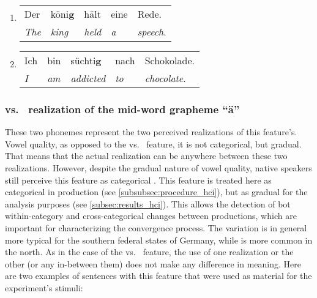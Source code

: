 \begin{enumerate}[label=\arabic{enumi}\alph*), ref=\arabic{enumi}\alph*.)]
	\item 
	\begin{tabulary}{\linewidth}{LLLLL}
		Der				& köni\textbf{\underline{g}} & hält				& 	eine	& Rede.\\
		\textit{The}	& \textit{king} 			 & \textit{held}	& \emph{a}  & \emph{speech}.\\
	\end{tabulary}
	\item
	\begin{tabulary}{\linewidth}{LLLLL}
		Ich 		& bin		  & süchti\textbf{\underline{g}} & nach 		& Schokolade.\\
		\textit{I}  & \textit{am} & \textit{addicted} 			 & \textit{to}  & \textit{chocolate}.\\
	\end{tabulary}
\end{enumerate}
	
\subsubsection*{\textipa{[e:]} vs.\ \textipa{[E:]} realization of the mid-word grapheme \enquote{ä}}
	
These two phonemes represent the two perceived realizations of this feature's.
Vowel quality, as opposed to the \textipa{[\c{c}]} vs.\ \textipa{[k]} feature, it is not categorical, but gradual.
That means that the actual realization can be anywhere between these two realizations.
However, despite the gradual nature of vowel quality, native speakers still perceive this feature as categorical \citep[either \textipa{[e]} or \textipa{[E]}, cf.][]{Kuhl2004early, Kuhl1991human}.
This feature is treated here as categorical in production (see \cref{subsubsec:procedure_hci}), but as gradual for the analysis purposes (see \cref{subsec:results_hci}).
This allows the detection of bot within-category and cross-categorical changes between productions, which are important for characterizing the convergence process.
The \textipa{[E]} variation is in general more typical for the southern federal states of Germany, while \textipa{[e]} is more common in the north.
As in the case of the \textipa{[\c{c}]} vs.\ \textipa{[k]} feature, the use of one realization or the other (or any in-between them) does not make any difference in meaning.
Here are two examples of sentences with this feature that were used as material for the experiment's stimuli:
	
